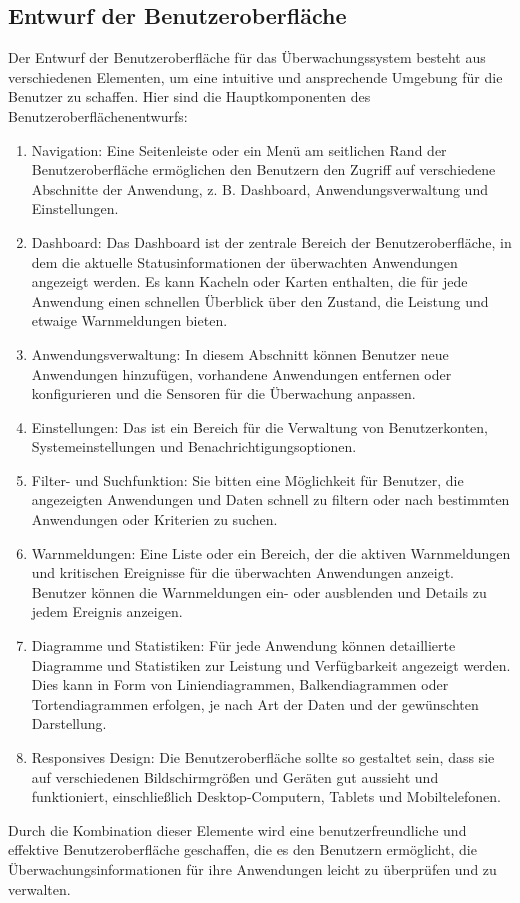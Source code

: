 \begin{flushleft}
	\subsection{Entwurf der Benutzeroberfläche}
	Der Entwurf der Benutzeroberfläche für das Überwachungssystem besteht aus verschiedenen Elementen, um eine intuitive und ansprechende Umgebung für die Benutzer zu schaffen. Hier sind die Hauptkomponenten des Benutzeroberflächenentwurfs:
	\begin{enumerate}
	\item Navigation: Eine Seitenleiste oder ein Menü am seitlichen Rand der Benutzeroberfläche ermöglichen den Benutzern den Zugriff auf verschiedene Abschnitte der Anwendung, z. B. Dashboard, Anwendungsverwaltung und Einstellungen.
	\item Dashboard: Das Dashboard ist der zentrale Bereich der Benutzeroberfläche, in dem die aktuelle Statusinformationen der überwachten Anwendungen angezeigt werden. Es kann Kacheln oder Karten enthalten, die für jede Anwendung einen schnellen Überblick über den Zustand, die Leistung und etwaige Warnmeldungen bieten.
	\item Anwendungsverwaltung: In diesem Abschnitt können Benutzer neue Anwendungen hinzufügen, vorhandene Anwendungen entfernen oder konfigurieren und die Sensoren für die Überwachung anpassen.
	\item Einstellungen: Das ist ein Bereich für die Verwaltung von Benutzerkonten, Systemeinstellungen und Benachrichtigungsoptionen.
	\item Filter- und Suchfunktion: Sie bitten eine Möglichkeit für Benutzer, die angezeigten Anwendungen und Daten schnell zu filtern oder nach bestimmten Anwendungen oder Kriterien zu suchen.
	\item Warnmeldungen: Eine Liste oder ein Bereich, der die aktiven Warnmeldungen und kritischen Ereignisse für die überwachten Anwendungen anzeigt. Benutzer können die Warnmeldungen ein- oder ausblenden und Details zu jedem Ereignis anzeigen.
	\item Diagramme und Statistiken: Für jede Anwendung können detaillierte Diagramme und Statistiken zur Leistung und Verfügbarkeit angezeigt werden. Dies kann in Form von Liniendiagrammen, Balkendiagrammen oder Tortendiagrammen erfolgen, je nach Art der Daten und der gewünschten Darstellung.
	\item Responsives Design: Die Benutzeroberfläche sollte so gestaltet sein, dass sie auf verschiedenen Bildschirmgrößen und Geräten gut aussieht und funktioniert, einschließlich Desktop-Computern, Tablets und Mobiltelefonen.
	\end{enumerate}
	Durch die Kombination dieser Elemente wird eine benutzerfreundliche und effektive Benutzeroberfläche geschaffen, die es den Benutzern ermöglicht, die Überwachungsinformationen für ihre Anwendungen leicht zu überprüfen und zu verwalten.


\end{flushleft}
